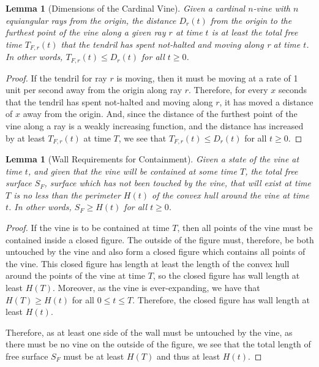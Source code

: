 \documentclass[12pt]{article}
\theoremstyle{plain}
\newtheorem{lemma}[theorem]{Lemma}
\theoremstyle{definition}
\begin{document}
\begin{lemma}[Dimensions of the Cardinal Vine]
\label{lma:dim-cardinal-vine}
Given a cardinal \(n\)-vine with \(n\) equiangular rays from the origin, the distance \(D_r(t)\) from the origin to the furthest point of the vine along a given ray \(r\) at time \(t\) is at least the total free time \(T_{F,r}(t)\) that the tendril has spent not-halted and moving along r at time \(t\). In other words, \(T_{F,r}(t)\leq D_r(t)\) for all \(t\geq 0\). 
\end{lemma}
\begin{proof}[Proof]
If the tendril for ray \(r\) is moving, then it must be moving at a rate of 1 unit per second away from the origin along ray \(r\). Therefore, for every \(x\) seconds that the tendril has spent not-halted and moving along \(r\), it has moved a distance of \(x\) away from the origin. And, since the distance of the furthest point of the vine along a ray is a weakly increasing function, and the distance has increased by at least \(T_{F,r}(t)\) at time \(T\), we see that \(T_{F,r}(t)\leq D_r(t)\) for all \(t\geq 0\). 
\end{proof}


\begin{lemma}[Wall Requirements for Containment]
\label{lma:wall-reqs-contain}
Given a state of the vine at time \(t\), and given that the vine will be contained at some time \(T\), the total free surface \(S_F\), surface which has not been touched by the vine, that will exist at time \(T\) is no less than the perimeter \(H(t)\) of the convex hull around the vine at time \(t\). In other words, \(S_F\geq H(t)\) for all \(t\geq 0\). 
\end{lemma}
\begin{proof}[Proof]
If the vine is to be contained at time \(T\), then all points of the vine must be contained inside a closed figure. The outside of the figure must, therefore, be both untouched by the vine and also form a closed figure which contains all points of the vine. This closed figure has length at least the length of the convex hull around the points of the vine at time \(T\), so the closed figure has wall length at least \(H(T)\). Moreover, as the vine is ever-expanding, we have that \(H(T)\geq H(t)\) for all \(0\leq t\leq T\). Therefore, the closed figure has wall length at least \(H(t)\). 

Therefore, as at least one side of the wall must be untouched by the vine, as there must be no vine on the outside of the figure, we see that the total length of free surface \(S_F\) must be at least \(H(T)\) and thus at least \(H(t)\). 
\end{proof}
\end{document}
